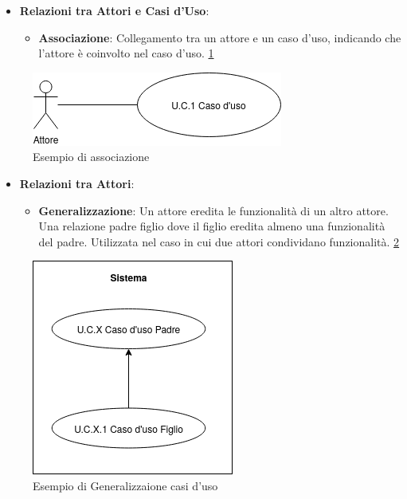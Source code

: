 \begin{itemize}
    \item \textbf{Relazioni tra Attori e Casi d’Uso}: 
    \begin{itemize}
        \item \textbf{Associazione}: Collegamento tra un attore e un caso d’uso, indicando che l’attore è coinvolto nel caso d’uso. \ref{fig:associazione}
    \end{itemize}
\end{itemize}

\begin{figure}[H]
    \centering
    \includegraphics{../../../img/associazione.png}
    \caption{Esempio di associazione}
    \label{fig:associazione}
\end{figure}

\begin{itemize}
    \item \textbf{Relazioni tra Attori}:
    \begin{itemize}
        \item \textbf{Generalizzazione}: Un attore eredita le funzionalità di un altro attore. Una relazione padre figlio dove il figlio eredita almeno una funzionalità del padre. Utilizzata nel caso in cui due attori condividano funzionalità. \ref{fig:generalizzazione_casiuso}
    \end{itemize}
\end{itemize}

\begin{figure}[H]
    \centering
    \includegraphics{../../../img/Generalizzazione_casiuso.png}
    \caption{Esempio di Generalizzaione casi d'uso}
    \label{fig:generalizzazione_casiuso}
\end{figure}

